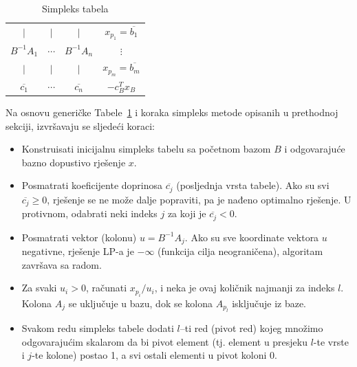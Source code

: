 \documentclass[a4paper, utf8, 11pt, colorlinks]{book}
\theoremstyle{definition}
\begin{document}
\begin{table}[!ht]
    \centering
    \begin{tabular}{c c c | c} \\ \hline
            $\mid$          &       $\mid$ &  $\mid$             &    $x_{p_1} = \overline{b_1}$         \\
          $B^{-1}A_1$       &    $\cdots$    &  $B^{-1}A_n$      &    $\vdots$          \\
            $\mid$          &       $\mid$ &  $\mid$             &   $ x_{p_m} = \overline{b_m}$         \\ \hline
          $\overline{c_1}$  &    $\cdots$    & $\overline{c_n}$  &  $-c^T_B x_B$         \\ \hline
    \end{tabular}
    \caption{Simpleks tabela}
    \label{tab:simplex_tabelau}
\end{table}

Na osnovu generičke Tabele~\ref{tab:simplex_tabelau} i koraka simpleks metode opisanih u prethodnoj sekciji, izvršavaju se sljedeći koraci:
\begin{itemize}
    \item Konstruisati inicijalnu simpleks tabelu sa početnom bazom $B$ i odgovarajuće bazno dopustivo rješenje $x$.
    \item Posmatrati koeficijente doprinosa $\overline{c_j}$ (posljednja vrsta tabele). Ako su svi $\overline{c_j} \geq 0$, rješenje se ne može dalje popraviti, pa je nađeno optimalno rješenje. U protivnom, odabrati neki indeks $j$ za koji je $\overline{c_j}<0$.
    \item Posmatrati vektor (kolonu) $u = B^{-1}A_j$. Ako su sve koordinate vektora $u$ negativne, rješenje LP-a je $-\infty$ (funkcija cilja neograničena), algoritam završava sa radom.
    \item Za svaki $u_i > 0$, računati $x_{p_i}/u_i$, i neka je   ovaj količnik najmanji za indeks $l$. Kolona $A_{j}$ se uključuje u bazu, dok se kolona $A_{p_l}$ isključuje iz baze. 
    \item Svakom redu simpleks tabele dodati $l$--ti red (pivot red) kojeg množimo odgovarajućim
         skalarom da bi pivot element (tj. element u presjeku $l$-te vrste i $j$-te kolone) postao 1, a svi ostali elementi u pivot koloni 0.
\end{itemize}
\end{document}
